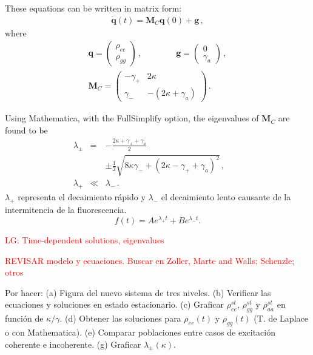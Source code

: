 \documentclass[twocolumn,aps,eqsecnum,showkeys,amsmath]{revtex4-2}
\begin{document}
These equations can be written in matrix form:
%
\begin{eqnarray}
\dot{\mathbf{q}}(t) = \mathbf{M}_C \mathbf{q}(0) +\mathbf{g} 	\,,
\end{eqnarray}
where 
%
\begin{eqnarray}
\mathbf{q} = \left( \begin{array}{c} \rho_{ee} \\ \rho_{gg} \end{array}  \right) \,, 
	\qquad \qquad
\mathbf{g} = \left( \begin{array}{c} 0 \\ \gamma_a \end{array}  \right) \,, \\
\mathbf{M}_C = \left( \begin{array}{cc} -\gamma_+ & 2\kappa \\ 
	\gamma_- & -(2\kappa +\gamma_a)  \end{array}  \right) \,.  
\end{eqnarray}
 
Using Mathematica, with the FullSimplify option, the eigenvalues of 
$\mathbf{M}_C$ are found to be
%
\begin{subequations}
\begin{eqnarray}
\lambda_{\pm} &=& - \frac{2\kappa +\gamma_+ +\gamma_a}{2} \nonumber \\
	&&\pm \frac{1}{2} 
	\sqrt{ 8\kappa \gamma_- +(2\kappa -\gamma_+ +\gamma_a)^2  } \,, 
	\qquad \\
\lambda_+ &\ll& \lambda_- \,.  
\end{eqnarray}
\end{subequations}
$\lambda_+$ representa el decaimiento r\'apido y $\lambda_-$ el 
decaimiento lento causante de la intermitencia de la fluorescencia. 
$$ f(t) = A e^{\lambda_+ t} +B e^{\lambda_- t} .$$ 

\textcolor{red}{LG: Time-dependent solutions, eigenvalues}

\textcolor{red}{REVISAR modelo y ecuaciones. Buscar en Zoller, Marte 
and Walls; Schenzle; otros}

Por hacer: (a) Figura del nuevo sistema de tres niveles. (b) Verificar 
las ecuaciones y soluciones en estado estacionario. (c) Graficar 
$\rho_{ee}^{st}$, $\rho_{gg}^{st}$  y $\rho_{aa}^{st}$ en funci\'on de 
$\kappa/\gamma$. (d) Obtener las soluciones para $\rho_{ee}(t)$ y 
$\rho_{gg}(t)$ (T. de Laplace o con Mathematica). (e) Comparar 
poblaciones entre casos de excitaci\'on coherente e incoherente. 
(g) Graficar $\lambda_{\pm}(\kappa)$. 
\end{document}
